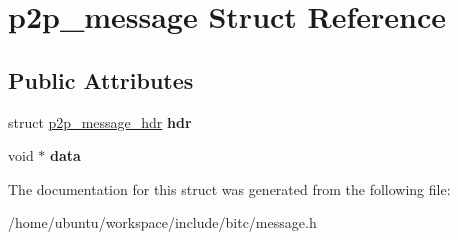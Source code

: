 \hypertarget{structp2p__message}{\section{p2p\-\_\-message Struct Reference}
\label{structp2p__message}
}
\subsection*{Public Attributes}
\begin{DoxyCompactItemize}
\item 
\hypertarget{structp2p__message_a62898b508b5fc50b46a0003e748fdda1}{struct \hyperlink{structp2p__message__hdr}{p2p\-\_\-message\-\_\-hdr} {\bfseries hdr}}\label{structp2p__message_a62898b508b5fc50b46a0003e748fdda1}

\item 
\hypertarget{structp2p__message_a26c660db217f66c4498510c0148ca4ad}{void $\ast$ {\bfseries data}}\label{structp2p__message_a26c660db217f66c4498510c0148ca4ad}

\end{DoxyCompactItemize}


The documentation for this struct was generated from the following file\-:\begin{DoxyCompactItemize}
\item 
/home/ubuntu/workspace/include/bitc/message.\-h\end{DoxyCompactItemize}
